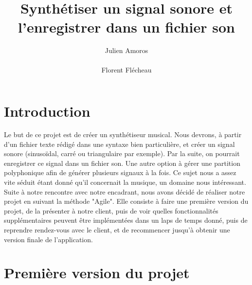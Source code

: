\documentclass{EPUProjetPeiP}
\title[Synthétiseur Musical]{Synthétiser un signal sonore et l'enregistrer dans un fichier son}
\author{Julien Amoros\\ %
\noindent[\url{julien.amoros@etu.univ-tours.fr}]\\
Florent Flécheau\\ %
\noindent[\url{florent.flecheau@etu.univ-tours.fr}]}
\begin{document}
\maketitle

\setcounter{page}{0}

{
\setlength{\parskip}{0em}

\tableofcontents


}


\start

\chapter*{Introduction}

Le but de ce projet est de créer un synthétiseur musical. Nous devrons, à partir d'un fichier texte rédigé dans une syntaxe bien particulière, et créer un signal sonore (sinusoïdal, carré ou triangulaire par exemple). Par la suite, on pourrait enregistrer ce signal dans un fichier son. Une autre option à gérer une partition polyphonique afin de générer plusieurs signaux à la fois. 
Ce sujet nous a assez vite séduit étant donné qu'il concernait la musique, un domaine nous intéressant.
Suite à notre rencontre avec notre encadrant, nous avons décidé de réaliser notre projet en suivant la méthode "Agile". Elle consiste à faire une première version du projet, de la présenter à notre client, puis de voir quelles fonctionnalités supplémentaires peuvent être implémentées dans un laps de temps donné, puis de reprendre rendez-vous avec le client, et de recommencer jusqu'à obtenir une version finale de l'application.


\chapter{Première version du projet}
\end{document}
